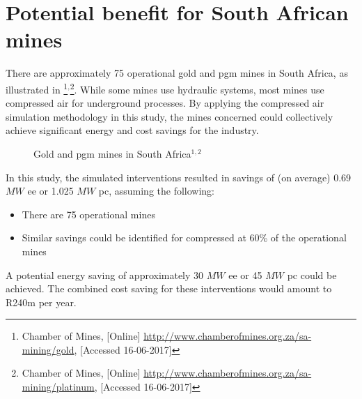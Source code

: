 \section{Potential benefit for South African mines}
There are approximately 75 operational gold and \gls{pgm} mines in South Africa, as illustrated in \footnote{Chamber of Mines, [Online] \url{http://www.chamberofmines.org.za/sa-mining/gold}, [Accessed 16-06-2017]}$^,$\footnote{Chamber of Mines, [Online] \url{http://www.chamberofmines.org.za/sa-mining/platinum}, [Accessed 16-06-2017]}. While some mines use hydraulic systems, most mines use compressed air for underground processes. By applying the compressed air simulation methodology in this study, the mines concerned could collectively achieve significant energy and cost savings for the industry. 
\par 
	\begin{figure}[h!]
		\centering
		\caption[Gold and Platinum group metal mines in South Africa]{Gold and \gls{pgm} mines in South Africa$^{1,2}$}
		\label{fig: Mine map}
	\end{figure}
In this study, the simulated interventions resulted in savings of (on average) 0.69 $MW$ \gls{ee} or 1.025 $MW$ \gls{pc}, assuming the following:
\begin{itemize}
	\item There are 75 operational mines
	\item Similar savings could be identified for compressed at 60\% of the operational mines
\end{itemize} 
A potential energy saving of approximately 30 $MW$ \gls{ee} or 45 $MW$ \gls{pc} could be achieved. The combined cost saving for these interventions would amount to R240m per year. 


